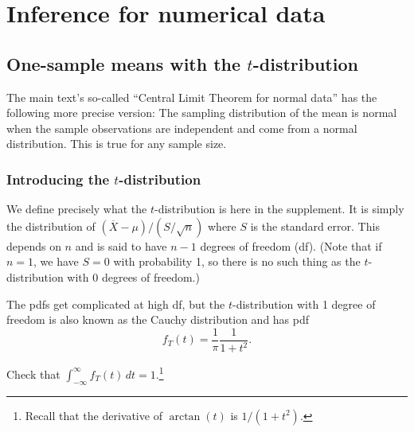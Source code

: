 \chapter{Inference for numerical data}
\label{inferenceForNumericalData}


\section{One-sample means with the \texorpdfstring{$t$}{t}-distribution}
\label{oneSampleMeansWithTDistribution}

The main text's so-called ``Central Limit Theorem for normal data'' has the following more precise version:
The sampling distribution of the mean is normal when the sample observations are independent and come from a normal distribution. This is true for any sample size.



\subsection{Introducing the $t$-distribution}
\label{introducingTheTDistribution}


We define precisely what the $t$-distribution is here in the supplement.
It is simply the distribution of $(\overline X-\mu)/(S/\sqrt{n})$ where $S$ is the standard error. This depends on $n$ and is said to have $n-1$ degrees of freedom (df). (Note that if $n=1$, we have $S=0$ with probability 1, so there is no such thing as the $t$-distribution with 0 degrees of freedom.)

The pdfs get complicated at high df, but the $t$-distribution with 1 degree of freedom is also known as the Cauchy distribution and has pdf
\[
	f_T(t) = \frac1\pi \frac1{1+t^2}.
\]
\begin{exercise}
	Check that $\int_{-\infty}^\infty f_T(t)\,dt = 1$.\footnote{Recall that the derivative of $\arctan(t)$ is $1/(1+t^2)$.}
\end{exercise}

